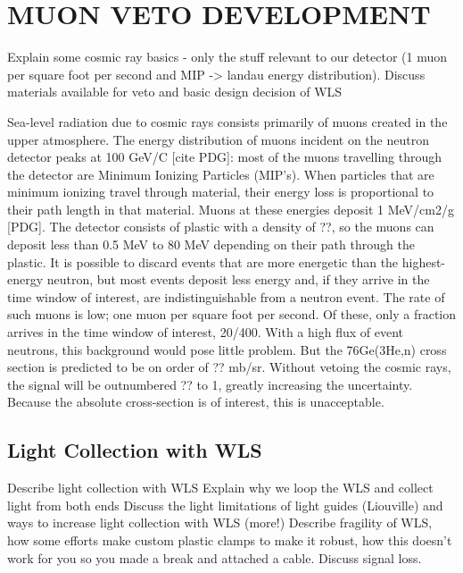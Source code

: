 %
%
%
%
%
%
%
%

%
%

\chapter{MUON VETO DEVELOPMENT}
\label{chap:muVeto}
Explain some cosmic ray basics - only the stuff relevant to our detector (1 muon per square foot per second and MIP -> landau energy distribution).
Discuss materials available for veto and basic design decision of WLS

Sea-level radiation due to cosmic rays consists primarily of muons created in the upper atmosphere.  The energy distribution of muons incident on the neutron detector peaks at 100 GeV/C [cite PDG]: most of the muons travelling through the detector are Minimum Ionizing Particles (MIP's).  When particles that are minimum ionizing travel through material, their energy loss is proportional to their path length in that material.  Muons at these energies deposit 1 MeV/cm2/g [PDG].  The detector consists of plastic with a density of ??, so the muons can deposit less than 0.5 MeV to 80 MeV depending on their path through the plastic.  It is possible to discard events that are more energetic than the highest-energy neutron, but most events deposit less energy and, if they arrive in the time window of interest, are indistinguishable from a neutron event.  The rate of such muons is low; one muon per square foot per second.  Of these, only a fraction arrives in the time window of interest, 20/400.  With a high flux of event neutrons, this background would pose little problem.  But the 76Ge(3He,n) cross section is predicted to be on order of ?? mb/sr.  Without vetoing the cosmic rays, the signal will be outnumbered ?? to 1, greatly increasing the uncertainty.  Because the absolute cross-section is of interest, this is unacceptable. 

\section{Light Collection with WLS}
Describe light collection with WLS
Explain why we loop the WLS and collect light from both ends
Discuss the light limitations of light guides (Liouville) and ways to increase light collection with WLS (more!)
Describe fragility of WLS, how some efforts make custom plastic clamps to make it robust, how this doesn't work for you so you made a break and attached a cable.  Discuss signal loss.

